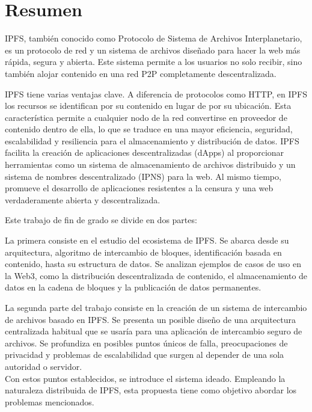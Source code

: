 \chapter*{Resumen}

IPFS, también conocido como Protocolo de Sistema de Archivos Interplanetario,
es un protocolo de red y un sistema de archivos diseñado para hacer
la web más rápida, segura y abierta. Este sistema permite a los usuarios no
solo recibir, sino también alojar contenido en una red P2P completamente descentralizada.

IPFS tiene varias ventajas clave. A diferencia de protocolos como HTTP, en IPFS los recursos se identifican
por su contenido en lugar de por su ubicación. Esta característica permite a cualquier nodo de la red
convertirse en proveedor de contenido dentro de ella, lo que se traduce en una mayor eficiencia, seguridad,
escalabilidad y resiliencia para el almacenamiento y distribución de datos.
IPFS facilita la creación de aplicaciones descentralizadas (dApps) al proporcionar herramientas como
un sistema de almacenamiento de archivos distribuido y un sistema de nombres descentralizado (IPNS) para la web. Al mismo tiempo, promueve el desarrollo de aplicaciones resistentes a la censura y una web verdaderamente abierta y descentralizada.

Este trabajo de fin de grado se divide en dos partes:

La primera consiste en el estudio del ecosistema de IPFS. Se abarca desde su arquitectura, algoritmo de intercambio de bloques,
identificación basada en contenido, hasta su estructura de datos. Se analizan ejemplos de casos de uso en la
Web3, como la distribución descentralizada de contenido, el almacenamiento de datos en la cadena de bloques y
la publicación de datos permanentes.

La segunda parte del trabajo consiste en la creación de un sistema de intercambio de archivos basado en IPFS.
Se presenta un posible diseño de una arquitectura centralizada habitual que se usaría para una aplicación de intercambio seguro de archivos.
Se profundiza en posibles puntos únicos de falla, preocupaciones de privacidad y problemas de escalabilidad que surgen al depender de una sola autoridad o servidor.
\\Con estos puntos establecidos, se introduce el sistema ideado. Empleando la naturaleza distribuida de IPFS, esta propuesta tiene como objetivo abordar los problemas mencionados.

